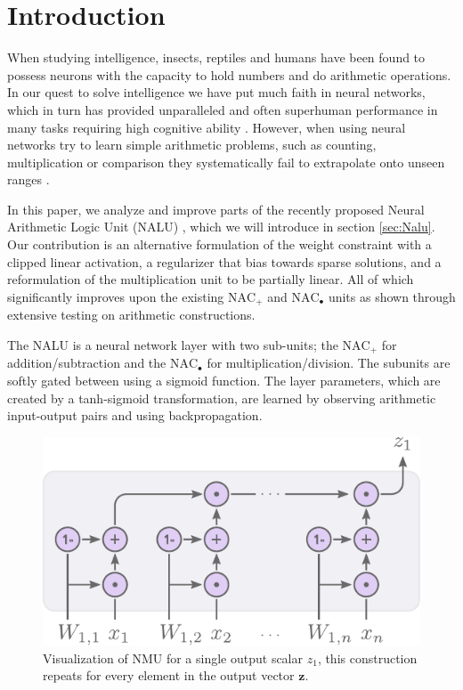 \section{Introduction}
When studying intelligence, insects, reptiles and humans have been found to possess neurons with the capacity to hold numbers and do arithmetic operations\cite{nieder-neuronal-number,rugani-arithmetic-chicks,gallistel-numbers-in-brain}.
In our quest to solve intelligence we have put much faith in neural networks, which in turn has provided unparalleled and often superhuman performance in many tasks requiring high cognitive ability \cite{natureGo,googleNMT,resnet}.
However, when using neural networks try to learn simple arithmetic problems, such as counting, multiplication or comparison they systematically fail to extrapolate onto unseen ranges \cite{stillNotSystematic,suzgun2019evaluating,trask-nalu}.

In this paper, we analyze and improve parts of the recently proposed Neural Arithmetic Logic Unit (NALU) \cite{trask-nalu}, which we will introduce in section \ref{sec:Nalu}. Our contribution is an alternative formulation of the weight constraint with a clipped linear activation, a regularizer that bias towards sparse solutions, and a reformulation of the multiplication unit to be partially linear. All of which significantly improves upon the existing $\text{NAC}_{+}$ and $\text{NAC}_{\bullet}$ units as shown through extensive testing on arithmetic constructions.%

The NALU is a neural network layer with two sub-units; the $\text{NAC}_{+}$ for addition/subtraction and the $\text{NAC}_{\bullet}$ for multiplication/division.
The subunits are softly gated between using a sigmoid function. The layer parameters, which are created by a tanh-sigmoid transformation, are learned by observing arithmetic input-output pairs and using backpropagation\cite{rumelhart1986learning}.

\begin{figure}[h]
\centering
\includegraphics[scale=0.7]{graphics/nmu.pdf}
\caption{Visualization of NMU for a single output scalar $z_1$, this construction repeats for every element in the output vector $\mathbf{z}$.}
\end{figure}


